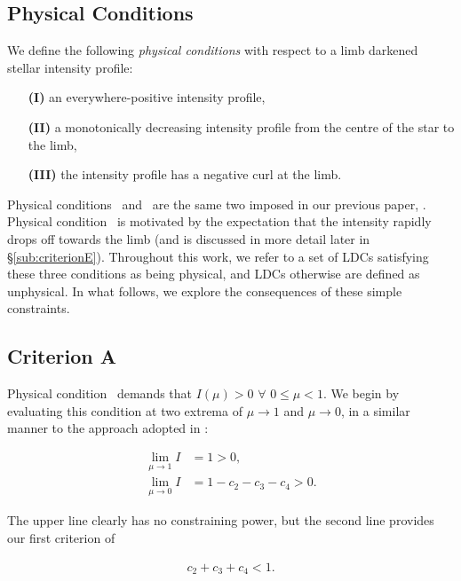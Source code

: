 
\subsection{Physical Conditions}
\label{sub:physicalconditions}

We define the following \textit{physical conditions} with respect to a limb
darkened stellar intensity profile:

\begin{itemize}
\item[{\textbf{(I)}}] an everywhere-positive intensity profile,
\item[{\textbf{(II)}}] a monotonically decreasing intensity profile from the
centre of the star to the limb,
\item[{\textbf{(III)}}] the intensity profile has a negative curl at the limb.
\end{itemize}

Physical conditions \I\ and \II\ are the same two imposed in our previous paper,
\citet{LD:2013}. Physical condition \III\ is motivated by the expectation that
the intensity rapidly drops off towards the limb (and is discussed in more 
detail later in \S\ref{sub:criterionE}). Throughout this work, we refer to a set 
of LDCs satisfying these three conditions as being physical, and LDCs otherwise 
are defined as unphysical. In what follows, we explore the consequences of these 
simple constraints.

\subsection{Criterion A}

Physical condition \I\ demands that $I(\mu)>0$ $\forall$ $0\leq\mu<1$. We begin 
by evaluating this condition at two extrema of $\mu\to1$ and $\mu\to0$, in a 
similar manner to the approach adopted in \citet{LD:2013}:

\begin{align}
\lim_{\mu\to1} I &= 1 > 0,\nonumber \\
\lim_{\mu\to0} I &= 1 - c_2 - c_3 -  c_4 > 0.
\end{align}

The upper line clearly has no constraining power, but the second line provides
our first criterion of

\begin{align}
c_2 + c_3 + c_4 < 1.
\label{eqn:criterionA}
\end{align}

